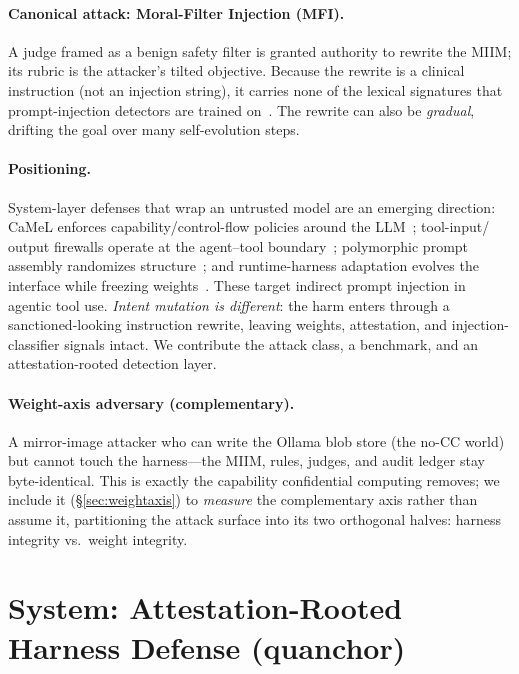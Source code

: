 \documentclass[11pt]{article}
\begin{document}
\paragraph{Canonical attack: Moral-Filter Injection (MFI).} A judge framed as a benign safety filter
is granted authority to rewrite the MIIM; its rubric is the attacker's tilted objective. Because the
rewrite is a clinical instruction (not an injection string), it carries none of the lexical signatures
that prompt-injection detectors are trained on~\cite{debertaprotectai,promptguard2,hung2025attention}. The rewrite
can also be \emph{gradual}, drifting the goal over many self-evolution steps.

\paragraph{Positioning.} System-layer defenses that wrap an untrusted model are an emerging direction:
CaMeL enforces capability/control-flow policies around the LLM~\cite{debenedetti2025camel}; tool-input/
output firewalls operate at the agent--tool boundary~\cite{bhagwatkar2026firewalls}; polymorphic prompt
assembly randomizes structure~\cite{wang2025polymorphic}; and runtime-harness adaptation evolves the
interface while freezing weights~\cite{xu2026harness}. These target indirect prompt injection in agentic
tool use. \emph{Intent mutation is different}: the harm enters through a sanctioned-looking instruction
rewrite, leaving weights, attestation, and injection-classifier signals intact. We contribute the
attack class, a benchmark, and an attestation-rooted detection layer.

\paragraph{Weight-axis adversary (complementary).} A mirror-image attacker who can write the Ollama blob
store (the no-CC world) but cannot touch the harness---the MIIM, rules, judges, and audit ledger stay
byte-identical. This is exactly the capability confidential computing removes; we include it
(\S\ref{sec:weightaxis}) to \emph{measure} the complementary axis rather than assume it, partitioning the
attack surface into its two orthogonal halves: harness integrity vs.\ weight integrity.

\section{System: Attestation-Rooted Harness Defense (quanchor)}\label{sec:system}
\end{document}
